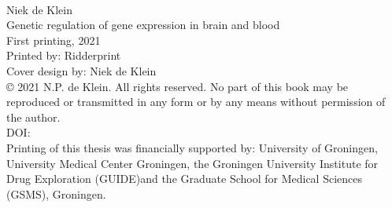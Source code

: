 
\clearpage

{\small
	\noindent
	\vspace*{\fill}
	\\
	Niek de Klein \\
	Genetic regulation of gene expression in brain and blood \\
	
	First printing, 2021 \\
	Printed by: Ridderprint \\
	
	Cover design by: Niek de Klein \\
	
	© 2021 N.P. de Klein. All rights reserved. No part of this book may be reproduced or transmitted in any form or by any means without permission of the author.\\
		
	DOI:  \\
	
	Printing of this thesis was financially supported by: University of Groningen, University Medical Center Groningen, the Groningen University Institute for Drug Exploration (GUIDE)and the Graduate School for Medical Sciences (GSMS), Groningen.
	
}
\clearpage